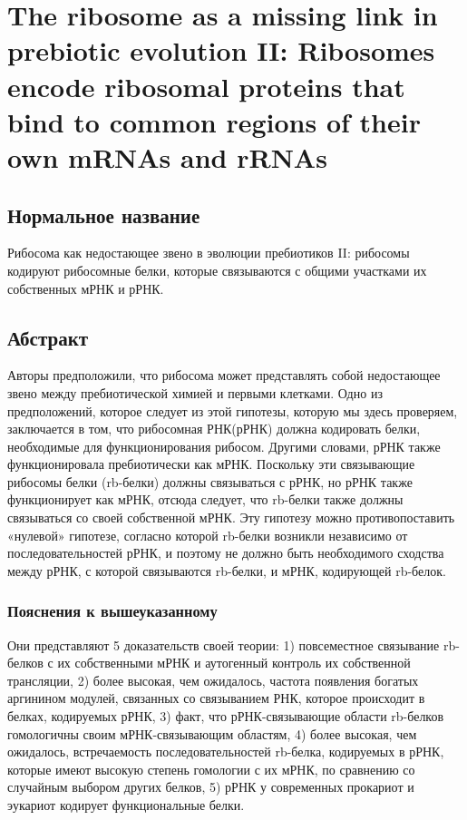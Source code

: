 \section{The ribosome as a missing link in prebiotic evolution II: Ribosomes encode ribosomal proteins that bind to common regions of their own mRNAs and rRNAs}

\subsection{Нормальное название}

Рибосома как недостающее звено в эволюции пребиотиков II: рибосомы кодируют рибосомные белки, которые связываются с общими участками их собственных мРНК и рРНК.

\subsection{Абстракт}
Авторы предположили, что рибосома может представлять собой недостающее звено между пребиотической химией и первыми клетками. Одно из предположений, которое следует из этой гипотезы, которую мы здесь проверяем, заключается в том, что рибосомная РНК(рРНК) должна кодировать белки, необходимые для функционирования рибосом. Другими словами, рРНК также функционировала пребиотически как мРНК. Поскольку эти связывающие рибосомы белки (rb-белки) должны связываться с рРНК, но рРНК также функционирует как мРНК, отсюда следует, что rb-белки также должны связываться со своей собственной мРНК. Эту гипотезу можно противопоставить «нулевой» гипотезе, согласно которой rb-белки возникли независимо от последовательностей рРНК, и поэтому не должно быть необходимого сходства между рРНК, с которой связываются rb-белки, и мРНК, кодирующей rb-белок.

\subsubsection{Пояснения к вышеуказанному}
Они представляют 5 доказательств своей теории: 1) повсеместное связывание rb-белков с их собственными мРНК и аутогенный контроль их собственной трансляции, 2) более высокая, чем ожидалось, частота появления богатых аргинином модулей, связанных со связыванием РНК, которое происходит в белках, кодируемых рРНК, 3) факт, что рРНК-связывающие области rb-белков гомологичны своим мРНК-связывающим областям, 4) более высокая, чем ожидалось, встречаемость последовательностей rb-белка, кодируемых в рРНК, которые имеют высокую степень гомологии с их мРНК, по сравнению со случайным выбором других белков, 5) рРНК у современных прокариот и эукариот кодирует функциональные белки.


